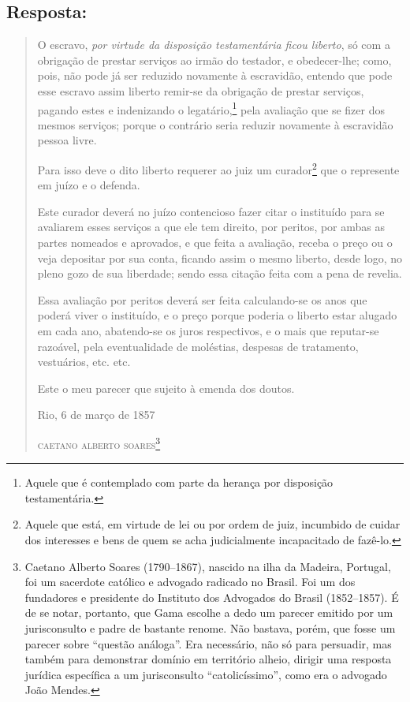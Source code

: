\subsection{Resposta:}

\begin{quote}
O escravo, \emph{por virtude da disposição testamentária ficou
liberto}, só com a obrigação de prestar serviços ao irmão do testador, e
obedecer-lhe; como, pois, não pode já ser reduzido novamente à
escravidão, entendo que pode esse escravo assim liberto remir-se da
obrigação de prestar serviços, pagando estes e indenizando o
legatário,\footnote{ Aquele que é contemplado com
  parte da herança por disposição testamentária.} pela avaliação que se
fizer dos mesmos serviços; porque o contrário seria reduzir novamente à
escravidão pessoa livre.

Para isso deve o dito liberto requerer ao juiz um curador\footnote{
  Aquele que está, em virtude de lei ou por ordem de juiz, incumbido de
  cuidar dos interesses e bens de quem se acha judicialmente
  incapacitado de fazê-lo.} que o represente em juízo e o defenda.

Este curador deverá no juízo contencioso fazer citar o instituído para
se avaliarem esses serviços a que ele tem direito, por peritos, por
ambas as partes nomeados e aprovados, e que feita a avaliação, receba o
preço ou o veja depositar por sua conta, ficando assim o mesmo liberto,
desde logo, no pleno gozo de sua liberdade; sendo essa citação feita com
a pena de revelia.

Essa avaliação por peritos deverá ser feita calculando-se os anos que
poderá viver o instituído, e o preço porque poderia o liberto estar
alugado em cada ano, abatendo-se os juros respectivos, e o mais que
reputar-se razoável, pela eventualidade de moléstias, despesas de
tratamento, vestuários, etc. etc.

Este o meu parecer que sujeito à emenda dos doutos.

\begin{flushright}
Rio, 6 de março de 1857

\textsc{caetano alberto soares}\footnote{ Caetano Alberto Soares
  (1790--1867), nascido na ilha da Madeira, Portugal, foi um sacerdote
  católico e advogado radicado no Brasil. Foi um dos fundadores e
  presidente do Instituto dos Advogados do Brasil (1852--1857). É de se
  notar, portanto, que Gama escolhe a dedo um parecer emitido por um
  jurisconsulto e padre de bastante renome. Não bastava, porém, que
  fosse um parecer sobre ``questão análoga''. Era necessário, não só
  para persuadir, mas também para demonstrar domínio em território
  alheio, dirigir uma resposta jurídica específica a um jurisconsulto
  ``catolicíssimo'', como era o advogado João Mendes.}
\end{flushright}


\end{quote}
